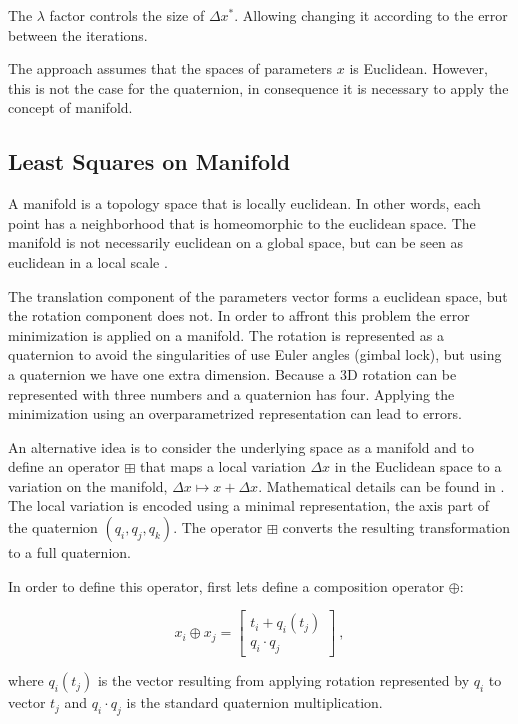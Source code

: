 \noindent The $\lambda$ factor controls the size of $ \Delta x^*$. Allowing changing it according to the error between the iterations.
 
The approach assumes that the spaces of parameters $x$ is Euclidean. However, this is not the case for the quaternion, 
in consequence it is necessary to apply the concept of manifold.


\subsection{Least Squares on Manifold}

A manifold is a topology space that is locally euclidean. In other words, each point has a neighborhood that is 
homeomorphic to the euclidean space. The manifold is not necessarily euclidean on a global space, but can be seen 
as euclidean in a local scale \cite{manifold}.

The translation component of the parameters vector forms a euclidean space, but the rotation component does not.
In order to affront this problem the error minimization is applied on a manifold. The rotation is represented as a 
quaternion to avoid the singularities of use Euler angles (gimbal lock), but using a quaternion we have one extra 
dimension. Because a 3D rotation can be represented with three numbers and a quaternion has four. Applying the 
minimization using an overparametrized representation can lead to errors.

An alternative idea is to consider the underlying space as a manifold
and to define an operator $\boxplus$ that maps a local variation
$\Delta x$ in the Euclidean space to a variation on the manifold, $\Delta x \mapsto x + \Delta x$. 
Mathematical details can be found in \cite{hertzberg08}. The local variation is encoded using a minimal 
representation, the axis part of the quaternion $(q_i,q_j,q_k)$. The operator $\boxplus$ converts the 
resulting transformation to a full quaternion.

In order to define this operator, first lets define a composition operator $\oplus$:

$$
x_i \oplus x_j = \begin{bmatrix} t_i + q_i(t_j) \\ q_i \cdot q_j \end{bmatrix} \ ,
$$

\noindent where $q_i(t_j)$ is the vector resulting from applying rotation represented by $q_i$ to vector $t_j$ and 
$q_i \cdot q_j$ is the standard quaternion multiplication.

